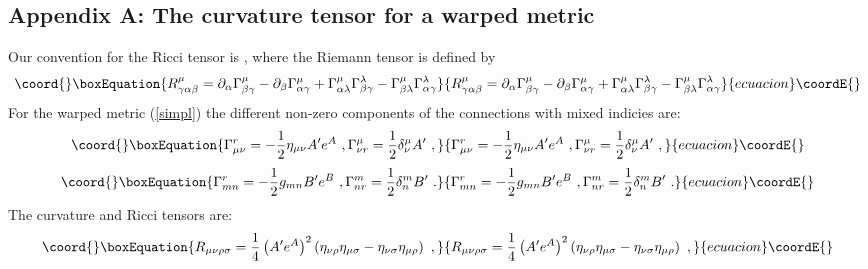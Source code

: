\documentclass[a4paper,12pt]{article}
\begin{document}
\newpage
\begin{appendix}

\renewcommand{\theequation}{A.\arabic{equation}}
\setcounter{equation}{0}

\section*{Appendix A: The curvature tensor for a warped metric}

Our convention for the Ricci tensor is \coordHE{}, where the Riemann tensor is defined by
\begin{equation}\coord{}\boxEquation{
R^{\mu}_{\gamma\alpha\beta}= \partial_{\alpha} \Gamma^{\mu}
_{\beta\gamma} -\partial_{\beta}\Gamma^{\mu}_{\alpha\gamma} +
\Gamma^{\mu}_{\alpha\lambda} \Gamma^{\lambda}_{\beta\gamma}-
\Gamma^{\mu} _{\beta\lambda}\Gamma^{\lambda}_{\alpha\gamma}
}{
R^{\mu}_{\gamma\alpha\beta}= \partial_{\alpha} \Gamma^{\mu}
_{\beta\gamma} -\partial_{\beta}\Gamma^{\mu}_{\alpha\gamma} +
\Gamma^{\mu}_{\alpha\lambda} \Gamma^{\lambda}_{\beta\gamma}-
\Gamma^{\mu} _{\beta\lambda}\Gamma^{\lambda}_{\alpha\gamma}
}{ecuacion}\coordE{}\end{equation}
For the warped metric (\ref{simpl}) the different non-zero components
of the connections with mixed indicies are:
\begin{equation}\coord{}\boxEquation{
\Gamma_{\mu\nu}^r = -\frac{1}{2}\eta_{\mu\nu}A'e^A~,
\Gamma_{\nu r}^\mu=  \frac{1}{2}\delta^\mu_\nu A'~,
}{
\Gamma_{\mu\nu}^r = -\frac{1}{2}\eta_{\mu\nu}A'e^A~,
\Gamma_{\nu r}^\mu=  \frac{1}{2}\delta^\mu_\nu A'~,
}{ecuacion}\coordE{}\end{equation}
\begin{equation}\coord{}\boxEquation{
\Gamma_{mn}^r = -\frac{1}{2}g_{mn}B'e^B~,
\Gamma_{n r}^m=  \frac{1}{2}\delta^m_n B'~.
}{
\Gamma_{mn}^r = -\frac{1}{2}g_{mn}B'e^B~,
\Gamma_{n r}^m=  \frac{1}{2}\delta^m_n B'~.
}{ecuacion}\coordE{}\end{equation}
The curvature and Ricci tensors  are:
\begin{equation}\coord{}\boxEquation{
R_{\mu\nu\rho\sigma}=\frac{1}{4}\left(A'e^A\right)^2
\left(\eta_{\nu\rho}\eta_{\mu\sigma}-
\eta_{\nu\sigma}\eta_{\mu\rho}\right)~,
}{
R_{\mu\nu\rho\sigma}=\frac{1}{4}\left(A'e^A\right)^2
\left(\eta_{\nu\rho}\eta_{\mu\sigma}-
\eta_{\nu\sigma}\eta_{\mu\rho}\right)~,
}{ecuacion}\coordE{}\end{equation}

\end{appendix}
\end{document}
